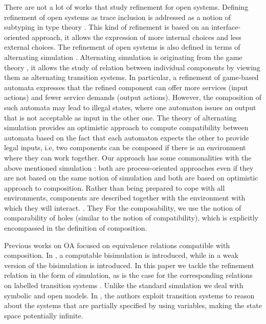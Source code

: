 \documentclass[runningheads]{llncs}
\begin{document}
There are not a lot of works that study refinement for open systems. Defining refinement of open systems as trace inclusion  is  addressed  as a notion of subtyping in type theory 
\cite{GayH:2005,BravettiZ:2021}. This kind of refinement is  based  on an interface-oriented approach, it allows the expression of more internal choices and less external choices. The refinement of open systems is also defined in terms of  alternating simulation \cite{Alur:1998,deAlfaro:2021}.
Alternating simulation  is originating from the game theory \cite{deAlfaro:2003}, it allows  the study of relation between individual components by viewing them as alternating transition systems. In particular,  a refinement of game-based automata expresses that the refined component can offer more services (input actions) and fewer service demands (output actions). However, the composition of such automata may
lead to illegal states, where one automaton issues an output that is not acceptable as input in the other one. The theory of alternating simulation provides an optimistic approach to compute compatibility between automata based on the fact that each automaton expects the other to provide  legal inputs, i.e, two components can be composed if there is an environment where they can work together. Our approach  has some commonalities with  the above mentioned simulation \cite{deAlfaro:2021}: both are process-oriented approaches even if they are not based on the same notion of simulation and both are based on optimistic approach to composition. Rather than being prepared to cope with all environments, components are described together with the environment with which they will interact.  . They 
For the composability, we use the notion of comparability of holes  (similar to the notion of compatibility), which is explicitly encompassed in the definition of composition.

 



Previous works on OA focused on equivalence relations compatible with composition.
In  \cite{10.1145/3372884.3373161}, a computable bisimulation is introduced, while in \cite{AMHEEMA:2023}  a weak version of the bisimulation is introduced. 
In this paper we tackle the refinement relation in the form of simulation, as is the case for the corresponding relations on labelled transition systems \cite{Bellegarde:2000}. Unlike the standard simulation we deal with symbolic and open models. In \cite{Zhang2014}, the authors exploit transition systems to reason about the systems  that are partially specified by using variables, making  the state space potentially infinite.
\end{document}
